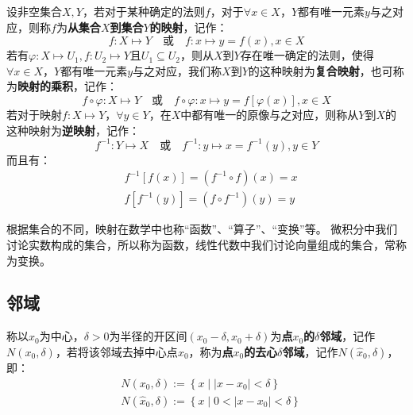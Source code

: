 \begin{definition}[映射]
设非空集合$X,Y$，若对于某种确定的法则$f$，对于$\forall x\in X$，$Y$都有唯一元素$y$与之对应，则称$f$为{\bf 从集合$X$到集合$Y$的映射}，记作：
\[
f:X\mapsto Y \quad \text{或} \quad f:x\mapsto y=f\left( x \right) ,x\in X
\]
若有$\varphi :X\mapsto U_1,f:U_2\mapsto Y$且$U_1\subseteq U_2$，则从$X$到$Y$存在唯一确定的法则，使得$\forall x\in X$，$Y$都有唯一元素$y$与之对应，我们称$X$到$Y$的这种映射为{\bf 复合映射}，也可称为{\bf 映射的乘积}，记作：
\[
f\circ \varphi :X\mapsto Y \quad \text{或} \quad f\circ \varphi :x\mapsto y=f\left[ \varphi \left( x \right) \right] ,x\in X
\]
若对于映射$f:X\mapsto Y$，$\forall y\in Y$，在$X$中都有唯一的原像与之对应，则称从$Y$到$X$的这种映射为{\bf 逆映射}，记作：
\[
f^{-1}:Y\mapsto X  \quad \text{或} \quad f^{-1}:y\mapsto x=f^{-1}\left( y \right) ,y\in Y
\]
而且有：
\begin{align*}
&f^{-1}\left[ f\left( x \right) \right] =\left( f^{-1}\circ  f \right) \left( x \right) =x \\
&f\left[ f^{-1}\left( y \right) \right] =\left( f\circ  f^{-1} \right) \left( y \right) =y
\end{align*}
\end{definition}

\begin{tcolorbox}
根据集合的不同，映射在数学中也称“函数”、“算子”、“变换”等。
微积分中我们讨论实数构成的集合，所以称为函数，线性代数中我们讨论向量组成的集合，常称为变换。
\end{tcolorbox}

\subsection{邻域}

\begin{definition}[邻域]
称以$x_0$为中心，$\delta >0$为半径的开区间$\left( x_0-\delta ,x_0+\delta \right) $为{\bf 点$x_0$的$\delta $邻域}，记作$N\left( x_0,\delta \right) $，若将该邻域去掉中心点$x_0$，称为{\bf 点$x_0$的去心$\delta $邻域}，记作$N\left( \hat{x}_0,\delta \right) $，即：
\begin{align*}
&N\left( x_0,\delta \right) :=\left\{ x \middle| \left| x-x_0 \right|<\delta \right\} \\
&N\left( \hat{x}_0,\delta \right) :=\left\{ x \middle| 0<\left| x-x_0 \right|<\delta \right\}
\end{align*}
\end{definition}

